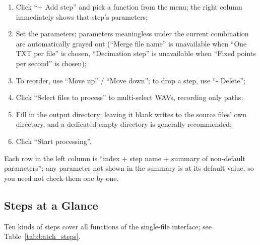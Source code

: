 \documentclass[UTF8,a4paper,12pt]{ctexart}
\begin{document}
\begin{enumerate}
  \item Click ``+ Add step'' and pick a function from the menu; the right column immediately shows that step's parameters;
  \item Set the parameters; parameters meaningless under the current combination are automatically grayed out (``Merge file name'' is unavailable when ``One TXT per file'' is chosen, ``Decimation step'' is unavailable when ``Fixed points per second'' is chosen);
  \item To reorder, use ``Move up'' / ``Move down''; to drop a step, use ``- Delete'';
  \item Click ``Select files to process'' to multi-select WAVs, recording only paths;
  \item Fill in the output directory; leaving it blank writes to the source files' own directory, and a dedicated empty directory is generally recommended;
  \item Click ``Start processing''.
\end{enumerate}

Each row in the left column is ``index + step name + summary of non-default parameters''; any parameter not shown in the summary is at its default value, so you need not check them one by one.

\subsection{Steps at a Glance}

Ten kinds of steps cover all functions of the single-file interface; see Table~\ref{tab:batch_steps}.
\end{document}
